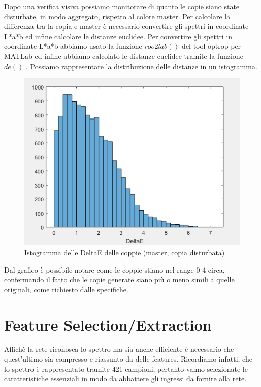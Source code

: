 Dopo una verifica visiva possiamo monitorare di quanto le copie siano state disturbate, in modo aggregato, rispetto al colore master. Per calcolare la differenza tra la copia e master è necessario convertire gli spettri in coordinate L*a*b ed infine calcolare le distanze euclidee. Per convertire gli spettri in coordinate L*a*b abbiamo usato la funzione \(roo2lab()\) del tool optrop per MATLab ed infine abbiamo calcolato le distanze euclidee tramite la funzione \(de()\) . Possiamo rappresentare la distribuzione delle distanze in un istogramma.

\begin{figure}
\begin{center}
	\includegraphics[scale=0.8]{images/rete1-istogramma-deltae.PNG}
\end{center}
\caption{Istogramma delle DeltaE delle coppie (master, copia disturbata)}
\end{figure}

Dal grafico è possibile notare come le coppie stiano nel range 0-4 circa, confermando il fatto che le copie generate siano più o meno simili a quelle originali, come richiesto dalle specifiche.

\section{Feature Selection/Extraction}
Affichè la rete riconosca lo spettro ma sia anche efficiente è necessario che quest'ultimo sia compresso e riassunto da delle features. Ricordiamo infatti, che lo spettro è rappresentato tramite 421 campioni, pertanto vanno selezionate le caratteristiche essenziali in modo da abbattere gli ingressi da fornire alla rete.

